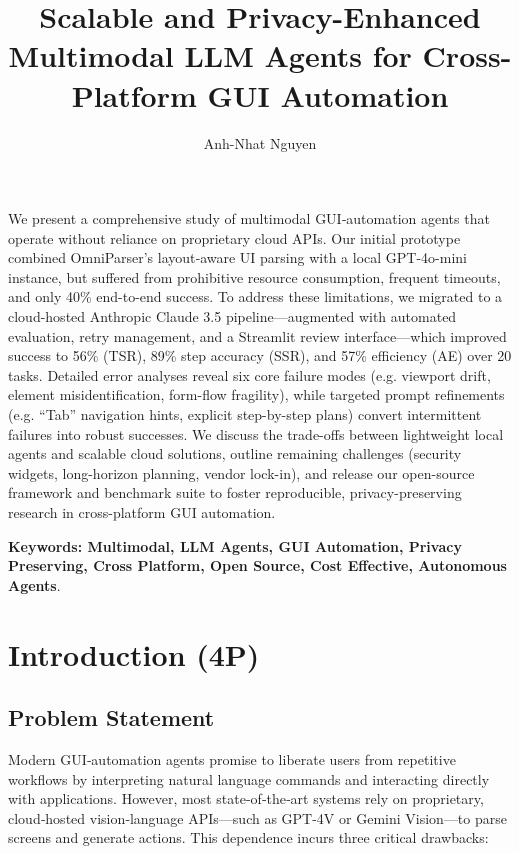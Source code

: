 \documentclass[runningheads]{llncs}
\title{Scalable and Privacy-Enhanced Multimodal LLM Agents for Cross-Platform GUI Automation}
\author{Anh-Nhat Nguyen\orcidID{2034311}}
\institute{University of Mannheim, Germany}
\begin{document}
\maketitle

\renewenvironment{abstract}{
	\noindent\textbf{\abstractname}\hspace{1em}\itshape
}{\par\vspace{12pt}}
\begin{abstract}
We present a comprehensive study of multimodal GUI‐automation agents that operate without reliance on proprietary cloud APIs.  Our initial prototype combined OmniParser’s layout‐aware UI parsing with a local GPT-4o-mini instance, but suffered from prohibitive resource consumption, frequent timeouts, and only 40\% end-to-end success.  To address these limitations, we migrated to a cloud-hosted Anthropic Claude 3.5 pipeline—augmented with automated evaluation, retry management, and a Streamlit review interface—which improved success to 56\% (TSR), 89\% step accuracy (SSR), and 57\% efficiency (AE) over 20 tasks.  Detailed error analyses reveal six core failure modes (e.g. viewport drift, element misidentification, form-flow fragility), while targeted prompt refinements (e.g. “Tab” navigation hints, explicit step-by-step plans) convert intermittent failures into robust successes.  We discuss the trade-offs between lightweight local agents and scalable cloud solutions, outline remaining challenges (security widgets, long-horizon planning, vendor lock-in), and release our open-source framework and benchmark suite to foster reproducible, privacy-preserving research in cross-platform GUI automation.
\end{abstract}
\noindent\textbf{Keywords: Multimodal, LLM Agents, GUI Automation, Privacy Preserving, Cross Platform, Open Source, Cost Effective, Autonomous Agents}.

\section{Introduction (4P) }
\subsection{Problem Statement}

Modern GUI‐automation agents promise to liberate users from repetitive workflows by interpreting natural language commands and interacting directly with applications. However, most state‐of‐the‐art systems rely on proprietary, cloud‐hosted vision‐language APIs—such as GPT-4V or Gemini Vision—to parse screens and generate actions. This dependence incurs three critical drawbacks:
\end{document}
